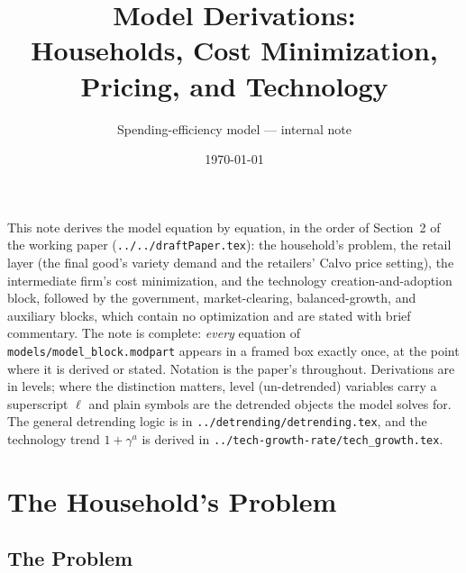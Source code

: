 \documentclass[11pt]{article}
\title{Model Derivations:\\ Households, Cost Minimization, Pricing, and Technology}
\author{Spending-efficiency model --- internal note}
\date{\today}
\begin{document}
\maketitle

\noindent
This note derives the model equation by equation, in the order of Section~2 of
the working paper (\texttt{../../draftPaper.tex}): the household's problem, the
retail layer (the final good's variety demand and the retailers' Calvo price
setting), the intermediate firm's cost minimization, and
the technology creation-and-adoption block, followed by the government,
market-clearing, balanced-growth, and auxiliary blocks, which contain no
optimization and are stated with brief commentary. The note is complete:
\emph{every} equation of \texttt{models/model\_block.modpart} appears in a
framed box exactly once, at the point where it is derived or stated.
Notation is the paper's throughout. Derivations are in levels; where the
distinction matters, level (un-detrended) variables carry a superscript $\ell$
and plain symbols are the detrended objects the model solves for. The general
detrending logic is in \texttt{../detrending/detrending.tex}, and the technology
trend $1+\gamma^{a}$ is derived in
\texttt{../tech-growth-rate/tech\_growth.tex}.

\tableofcontents

\section{The Household's Problem}\label{sec:hh}

\subsection{The Problem}
\end{document}
